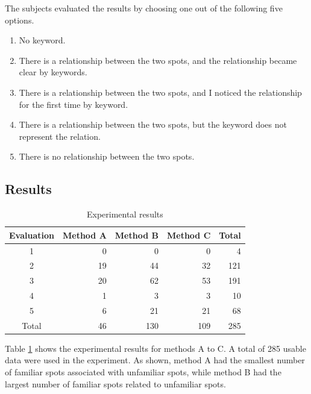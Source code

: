 \documentclass[journal]{IAENGtran}
\begin{document}
The subjects evaluated the results by choosing one out of the following five options.
\begin{enumerate}
  \item No keyword.
  \item There is a relationship between the two spots, and the relationship became clear by keywords.
  \item There is a relationship between the two spots, and I noticed the relationship for the first time by keyword.
  \item There is a relationship between the two spots, but the keyword does not represent the relation.
  \item There is no relationship between the two spots.
\end{enumerate}

\subsection{Results}
\label{subsec:Results}

\begin{table}[t]
  \caption{Experimental results}
  \label{table:Statistics on the number of data of experiment results}
  \centering
  \begin{tabular}{c|r|r|r|r}
  \hline
  Evaluation & \multicolumn{1}{c|}{Method A} & \multicolumn{1}{c|}{Method B} & \multicolumn{1}{c|}{Method C} &  \multicolumn{1}{c}{Total} \\ \hline
  1  & 0                      & 0                      & 0                      & 4                      \\
  2  & 19                     & 44                     & 32                     & 121                    \\
  3  & 20                     & 62                     & 53                     & 191                    \\
  4  & 1                      & 3                      & 3                      & 10                     \\
  5  & 6                      & 21                     & 21                     & 68                     \\ \hline
  Total & 46                     & 130                    & 109                    & 285                    \\ \hline
  \end{tabular}
\end{table}

   Table \ref{table:Statistics on the number of data of experiment results} shows the experimental results for methods A to C. A total of 285 usable data were used in the experiment. As shown, method A had the smallest number of familiar spots associated with unfamiliar spots, while method B had the largest number of familiar spots related to unfamiliar spots.
\end{document}

